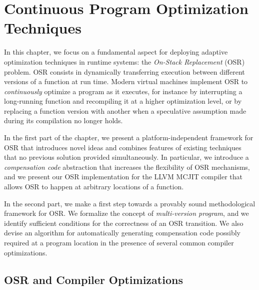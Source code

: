 \chapter{Continuous Program Optimization Techniques}
\label{ch:continuous}

In this chapter, we focus on a fundamental aspect for deploying adaptive optimization techniques in runtime systems: the {\em On-Stack Replacement} (OSR) problem. OSR consists in dynamically transferring execution between different versions of a function at run time. Modern virtual machines implement OSR to {\em continuously} optimize a program as it executes, for instance by interrupting a long-running function and recompiling it at a higher optimization level, or by replacing a function version with another when a speculative assumption made during its compilation no longer holds.

In the first part of the chapter, we present a platform-independent framework for OSR that introduces novel ideas and combines features of existing techniques that no previous solution provided simultaneously. In particular, we introduce a {\em compensation code} abstraction that increases the flexibility of OSR mechanisms, and we present our OSR implementation for the LLVM MCJIT compiler that allows OSR to happen at arbitrary locations of a function.

In the second part, we make a first step towards a provably sound methodological framework for OSR. We formalize the concept of {\em multi-version program}, and we identify sufficient conditions for the correctness of an OSR transition. We also devise an algorithm for automatically generating compensation code possibly required at a program location in the presence of several common compiler optimizations.




\section{OSR and Compiler Optimizations}

